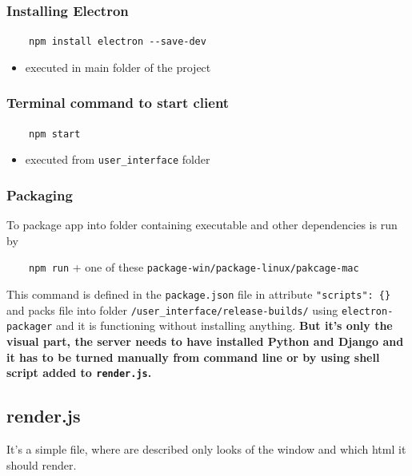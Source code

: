 \documentclass[12pt]{article}
\providecommand{\tightlist}{\setlength{\itemsep}{1pt}\setlength{\parskip}{1pt}}
\let\oldtexttt\texttt
\renewcommand{\texttt}[1]{\oldtexttt{\textcolor{codehighlight}{#1}}}
\begin{document}
\hypertarget{installing-electron}{%
\subsubsection{Installing Electron}\label{installing-electron}}

~~~~\texttt{npm\ install\ electron\ -\/-save-dev}

\begin{itemize}
\tightlist
\item
  executed in main folder of the project
\end{itemize}

\hypertarget{terminal-command-to-start-client}{%
\subsubsection{Terminal command to start
client}\label{terminal-command-to-start-client}}

~~~~\texttt{npm\ start}

\begin{itemize}
\tightlist
\item
  executed from \texttt{user\_interface} folder
\end{itemize}

\hypertarget{packaging}{%
\subsubsection{Packaging}\label{packaging}}

To package app into folder containing executable and other dependencies
is run by

~~~~\texttt{npm\ run} + one of these
\texttt{package-win/package-linux/pakcage-mac}

This command is defined in the \texttt{package.json} file in attribute
\texttt{"scripts":\ \{\}} and packs file into folder
\texttt{/user\_interface/release-builds/} using
\texttt{electron-packager} and it is functioning without installing
anything. \textbf{But it's only the visual part, the server needs to
have installed Python and Django and it has to be turned manually from
command line or by using shell script added to \texttt{render.js}.}

\hypertarget{render.js}{%
\subsection{render.js}\label{render.js}}

It's a simple file, where are described only looks of the window and
which html it should render.
\end{document}

